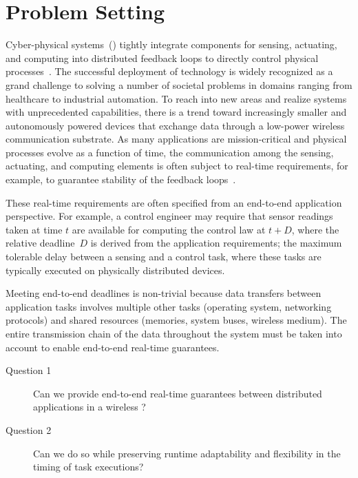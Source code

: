 
\section{Problem Setting}
\label{sec:drp_intro}

Cyber-physical systems~(\CPS) tightly integrate components for sensing, actuating, and computing into distributed feedback loops to directly control physical processes~\cite{rajkumar2010CPS}. The successful deployment of \CPS technology is widely recognized as a grand challenge to solving a number of societal problems in domains ranging from healthcare to industrial automation. To reach into new areas and realize systems with unprecedented capabilities, there is a trend toward increasingly smaller and autonomously powered \CPS devices that exchange data through a low-power wireless communication substrate. As many \CPS applications are mission-critical and physical processes evolve as a function of time, the communication among the sensing, actuating, and computing elements is often subject to real-time requirements, for example, to guarantee stability of the feedback loops~\cite{stankovic2005Opportunities}.

These real-time requirements are often specified from an end-to-end application perspective. For example, a control engineer may require that sensor readings taken at time $t$ are available for computing the control law at $t + D$, where the relative deadline~$D$ is derived from
the application requirements; \eg the maximum tolerable delay between a sensing and a control task, where these tasks are typically executed on physically distributed devices.

Meeting end-to-end deadlines is non-trivial because data transfers between application tasks involves multiple other tasks (\eg operating system, networking protocols) and shared resources (\eg memories, system buses, wireless medium).
The entire transmission chain of the data throughout the system must be taken into account to enable end-to-end real-time guarantees.

\begin{research_questions}
  \begin{description}
    \item[Question 1]
    Can we provide end-to-end real-time guarantees between distributed applications in a wireless \CPS?

    \item[Question 2]
    Can we do so while preserving runtime adaptability and flexibility in the timing of task executions?
  \end{description}
\end{research_questions}

